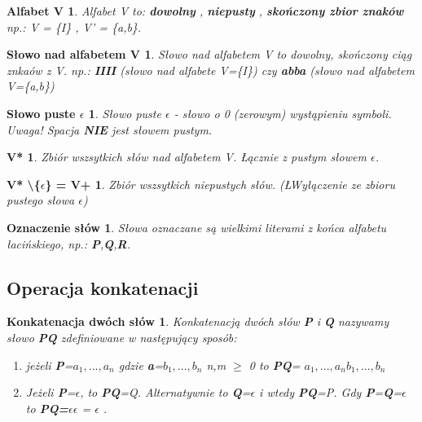 \newtheorem*{theorem3*}{Alfabet V}
\begin{theorem3*} Alfabet V to: { \bf dowolny} , { \bf niepusty} , { \bf skończony zbior znaków}  \newline np.: V = \{I\} , V' = \{a,b\}.
\newline


 \end{theorem3*}


\newtheorem*{theorem4*}{Słowo nad alfabetem V}
\begin{theorem4*} Słowo nad alfabetem V to dowolny, skończony ciąg znkaów z V. np.: {\bf IIII} (słowo nad alfabete V=\{I\}) czy {\bf abba} (słowo nad alfabetem V=\{a,b\}) 
 \end{theorem4*}


\newtheorem*{theorem5*}{Słowo puste $\epsilon$}
\begin{theorem5*}Słowo puste $\epsilon$ - słowo o 0 (zerowym) wystąpieniu symboli. Uwaga! Spacja {\bf NIE} jest słowem pustym.
 \end{theorem5*}
 
 
 \newtheorem*{theorem6*}{V*}
\begin{theorem6*}Zbiór wszsytkich słów nad alfabetem V. Łącznie z pustym słowem $\epsilon$.
 \end{theorem6*}
 
 
\newtheorem*{theorem7*}{V* \textbackslash \{$\epsilon$\} = V+}
\begin{theorem7*}
Zbiór wszsytkich niepustych słów. (ŁWyłączenie ze zbioru pustego słowa $\epsilon$)
 \end{theorem7*}
 
\newtheorem*{theorem8*}{Oznaczenie słów}
\begin{theorem8*}
Słowa oznaczane są wielkimi literami z końca alfabetu łacińskiego, np.: { \bf P},{\bf Q},{\bf R}. 
 \end{theorem8*}
 

\subsection{Operacja konkatenacji}

\newtheorem*{theorema*}{Konkatenacja dwóch słów}
\begin{theorema*}
Konkatenacją dwóch słów {\bf P} i {\bf Q} nazywamy słowo {\bf PQ} zdefiniowane w następujący sposób:

\begin{enumerate}[label=(\roman*)]
  \item jeżeli {\bf P}=$a_{1}, ... ,a_{n}$ gdzie {\bf a}=$b_{1}, ... ,b_{n}$ n,m $\ge$ 0 to {\bf PQ}= $a_{1},...,a_{n}b_{1},...,b_{n}$
  \item Jeżeli {\bf P}=$\epsilon$, to {\bf PQ}=Q.\newline 
  Alternatywnie to {\bf Q}=$\epsilon$ i wtedy {\bf PQ}=P. \newline
  Gdy {\bf P}={\bf Q}=$\epsilon$ to {\bf PQ=}$\epsilon\epsilon$ = $\epsilon$ . 
\end{enumerate} 

 
 \end{theorema*}



